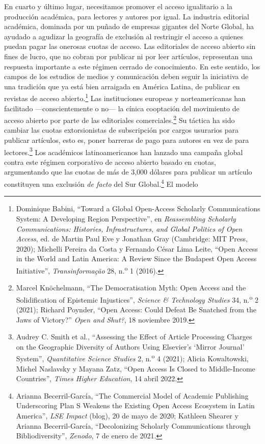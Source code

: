 \documentclass{tufte-handout}
\begin{document}
En cuarto y último lugar, necesitamos promover el acceso igualitario a
la producción académica, para lectores y autores por igual. La industria
editorial académica, dominada por un puñado de empresas gigantes del
Norte Global, ha ayudado a agudizar la geografía de exclusión al
restringir el acceso a quienes puedan pagar las onerosas cuotas de
acceso. Las editoriales de acceso abierto sin fines de lucro, que no
cobran por publicar ni por leer artículos, representan una respuesta
importante a este régimen cerrado de conocimiento. En este sentido, los
campos de los estudios de medios y comunicación deben seguir la
iniciativa de una tradición que ya está bien arraigada en América
Latina, de publicar en revistas de acceso abierto.\footnote{Dominique
  Babini, ``Toward a Global Open-Access Scholarly Communications System:
  A Developing Region Perspective'', en \emph{Reassembling Scholarly
  Communications: Histories, Infrastructures, and Global Politics of
  Open Access}, ed. de Martin Paul Eve y Jonathan Gray (Cambridge: MIT
  Press, 2020); Michelli Pereira da Costa y Fernando César Lima Leite,
  ``Open Access in the World and Latin America: A Review Since the
  Budapest Open Access Initiative'', \emph{Transinformação} 28,
  n.\textsuperscript{o} 1 (2016).} Las instituciones europeas y
norteamericanas han facilitado ---conscientemente o no--- la cínica
cooptación del movimiento de acceso abierto por parte de las editoriales
comerciales.\footnote{Marcel Knöchelmann, ``The Democratisation Myth:
  Open Access and the Solidification of Epistemic Injustices'',
  \emph{Science \& Technology Studies} 34, n.\textsuperscript{o} 2
  (2021); Richard Poynder, ``Open Access: Could Defeat Be Snatched from
  the Jaws of Victory?'' \emph{Open and Shut?}, 18 noviembre 2019.} Su
táctica ha sido cambiar las cuotas extorsionistas de subscripción por
cargos usurarios para publicar artículos, esto es, poner barreras de
pago para autores en vez de para lectores.\footnote{Audrey C. Smith et
  al., ``Assessing the Effect of Article Processing Charges on the
  Geographic Diversity of Authors Using Elsevier's `Mirror Journal'
  System'', \emph{Quantitative Science Studies} 2, n.\textsuperscript{o}
  4 (2021); Alicia Kowaltowski, Michel Naslavsky y Mayana Zatz, ``Open
  Access Is Closed to Middle-Income Countries'', \emph{Times Higher
  Education}, 14 abril 2022.} Los académicos latinoamericanos han
lanzado una campaña global contra este régimen corporativo de acceso
abierto basado en cuotas, argumentando que las cuotas de más de 3,000
dólares para publicar un artículo constituyen una exclusión \emph{de
facto} del Sur Global.\footnote{Arianna Becerril-García, ``The
  Commercial Model of Academic Publishing Underscoring Plan S Weakens
  the Existing Open Access Ecosystem in Latin America'', \emph{LSE
  Impact} (blog), 20 de mayo de 2020; Kathleen Shearer y Arianna
  Becerril-García, ``Decolonizing Scholarly Communications through
  Bibliodiversity'', \emph{Zenodo}, 7 de enero de 2021.} El modelo
\end{document}
